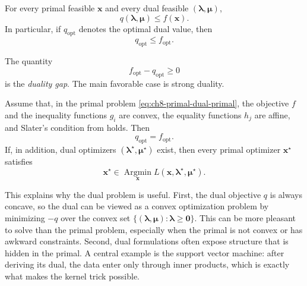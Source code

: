 \begin{theorem}
\label{thm:ch8-weak-duality}
For every primal feasible $\mathbf{x}$ and every dual feasible
$(\boldsymbol{\lambda},\boldsymbol{\mu})$,
\[
  q(\boldsymbol{\lambda},\boldsymbol{\mu}) \le f(\mathbf{x}).
\]
In particular, if $q_{\mathrm{opt}}$ denotes the optimal dual value, then
\[
  q_{\mathrm{opt}} \le f_{\mathrm{opt}}.
\]
\end{theorem}

The quantity
\[
  f_{\mathrm{opt}} - q_{\mathrm{opt}} \ge 0
\]
is the \emph{duality gap}. The main favorable case is strong duality.

\begin{theorem}
\label{thm:ch8-strong-duality}
Assume that, in the primal problem \eqref{eq:ch8-primal-dual-primal}, the
objective $f$ and the inequality functions $g_i$ are convex, the equality
functions $h_j$ are affine, and Slater's condition from 
holds. Then
\[
  q_{\mathrm{opt}} = f_{\mathrm{opt}}.
\]
If, in addition, dual optimizers
$(\boldsymbol{\lambda}^\star,\boldsymbol{\mu}^\star)$ exist, then every primal
optimizer $\mathbf{x}^\star$ satisfies
\[
  \mathbf{x}^\star \in
  \operatorname*{Argmin}_{\mathbf{x}}
  L(\mathbf{x},\boldsymbol{\lambda}^\star,\boldsymbol{\mu}^\star).
\]
\end{theorem}

This explains why the dual problem is useful. First, the dual objective
$q$ is always concave, so the dual can be viewed as a convex optimization
problem by minimizing $-q$ over the convex set
$\{(\boldsymbol{\lambda},\boldsymbol{\mu}):\boldsymbol{\lambda}\ge\mathbf{0}\}$.
This can be more pleasant to solve than the primal problem, especially when
the primal is not convex or has awkward constraints. Second, dual formulations
often expose structure that is hidden in the primal. A central example is the
support vector machine: after deriving its dual, the data enter only through
inner products, which is exactly what makes the kernel trick possible.

